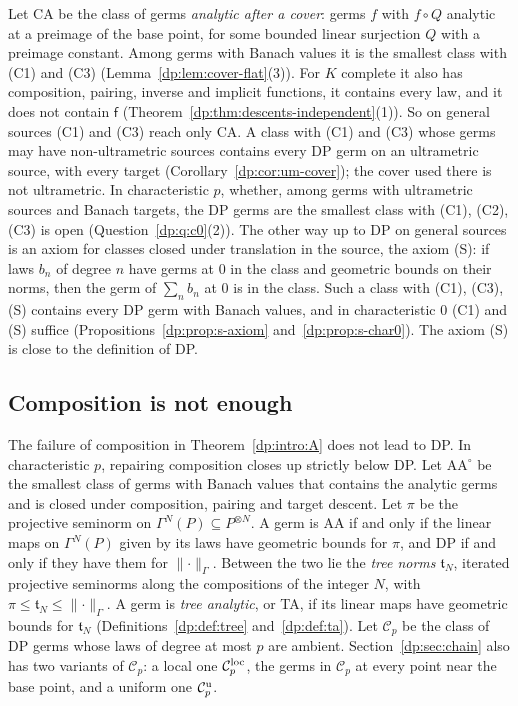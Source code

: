 \documentclass[11pt]{amsart}
\theoremstyle{definition}
\theoremstyle{remark}
\numberwithin{equation}{section}
\newcommand{\norm}[1]{\lVert #1\rVert}
\newcommand{\cC}{\mathcal{C}}
\theoremstyle{plain}
\theoremstyle{definition}
\theoremstyle{plain}
\begin{document}
Let CA be the class of germs \emph{analytic after a cover}: germs $f$ with $f\circ Q$ analytic at a preimage of the base point, for some bounded linear surjection $Q$ with a preimage constant. Among germs with Banach values it is the smallest class with (C1) and (C3) (Lemma~\ref{dp:lem:cover-flat}(3)). For $K$ complete it also has composition, pairing, inverse and implicit functions, it contains every law, and it does not contain $\mathsf f$ (Theorem~\ref{dp:thm:descents-independent}(1)). So on general sources (C1) and (C3) reach only CA. A class with (C1) and (C3) whose germs may have non-ultrametric sources contains every DP germ on an ultrametric source, with every target (Corollary~\ref{dp:cor:um-cover}); the cover used there is not ultrametric. In characteristic $p$, whether, among germs with ultrametric sources and Banach targets, the DP germs are the smallest class with (C1), (C2), (C3) is open (Question~\ref{dp:q:c0}(2)). The other way up to DP on general sources is an axiom for classes closed under translation in the source, the axiom (S): if laws $b_n$ of degree $n$ have germs at $0$ in the class and geometric bounds on their norms, then the germ of $\sum_nb_n$ at $0$ is in the class. Such a class with (C1), (C3), (S) contains every DP germ with Banach values, and in characteristic $0$ (C1) and (S) suffice (Propositions~\ref{dp:prop:s-axiom} and~\ref{dp:prop:s-char0}). The axiom (S) is close to the definition of DP.

\subsection*{Composition is not enough}

The failure of composition in Theorem~\ref{dp:intro:A} does not lead to DP. In characteristic $p$, repairing composition closes up strictly below DP. Let $\mathrm{AA}^\circ$ be the smallest class of germs with Banach values that contains the analytic germs and is closed under composition, pairing and target descent. Let $\pi$ be the projective seminorm on $\Gamma^N(P)\subseteq P^{\otimes N}$. A germ is AA if and only if the linear maps on $\Gamma^N(P)$ given by its laws have geometric bounds for $\pi$, and DP if and only if they have them for $\norm\cdot_\Gamma$. Between the two lie the \emph{tree norms} $\mathfrak t_N$, iterated projective seminorms along the compositions of the integer $N$, with $\pi\le\mathfrak t_N\le\norm\cdot_\Gamma$. A germ is \emph{tree analytic}, or TA, if its linear maps have geometric bounds for $\mathfrak t_N$ (Definitions~\ref{dp:def:tree} and~\ref{dp:def:ta}). Let $\cC_p$ be the class of DP germs whose laws of degree at most $p$ are ambient. Section~\ref{dp:sec:chain} also has two variants of $\cC_p$: a local one $\cC_p^{\rm loc}$, the germs in $\cC_p$ at every point near the base point, and a uniform one $\cC_p^{\rm u}$.
\end{document}
